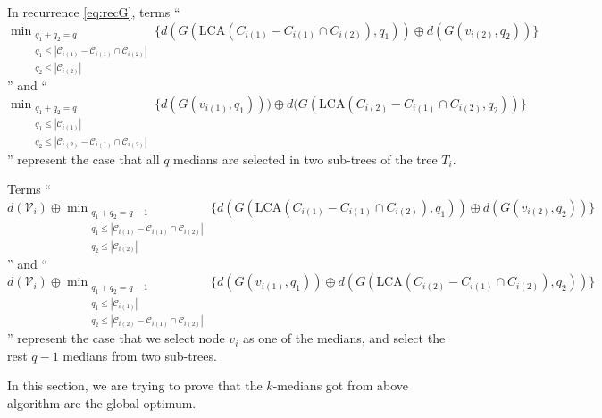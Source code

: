 \begin{itemize}
\begin{itemize}
        In recurrence \ref{eq:recG}, terms ``$ \min_{\substack{
                       q_1 + q_2 = q\\
                        q_1 \leq |\mathcal{C}_{i(1)} - \mathcal{C}_{i(1)} \cap \mathcal{C}_{i(2)}|\\
                        q_2 \leq |\mathcal{C}_{i(2)}| }}
                  \{ d(G(\mbox{LCA}(C_{i(1)} - C_{i(1)} \cap C_{i(2)}), q_1)) \oplus 
                     d(G(v_{i(2)}, q_2))
                  \}$''
                  and 
                  ``$ \min_{\substack{
                       q_1 + q_2 = q\\
                        q_1 \leq |\mathcal{C}_{i(1)}|\\
                        q_2 \leq |\mathcal{C}_{i(2)} - \mathcal{C}_{i(1)} \cap \mathcal{C}_{i(2)}| }}
                  \{ d(G(v_{i(1)}, q_1))) \oplus 
                     d(G(\mbox{LCA}(C_{i(2)} - C_{i(1)} \cap C_{i(2)}, q_2))
                  \}$''
        represent the case that all $q$ medians are selected in two sub-trees
        of the tree $T_i$. 

        Terms ``$d(\mathcal{V}_i) \oplus
            \min_{\substack{
                       q_1 + q_2 = q-1\\
                        q_1 \leq |\mathcal{C}_{i(1)} - \mathcal{C}_{i(1)} \cap \mathcal{C}_{i(2)}|\\
                        q_2 \leq |\mathcal{C}_{i(2)}| }}
                  \{ d(G(\mbox{LCA}(C_{i(1)} - C_{i(1)} \cap C_{i(2)}), q_1)) \oplus
                     d(G(v_{i(2)}, q_2))
                  \}$''
                  and 
            ``$d(\mathcal{V}_i) \oplus
            \min_{\substack{
                       q_1 + q_2 = q-1\\
                        q_1 \leq |\mathcal{C}_{i(1)}|\\
                        q_2 \leq |\mathcal{C}_{i(2)} - \mathcal{C}_{i(1)} \cap \mathcal{C}_{i(2)}|}}
                  \{ d(G(v_{i(1)}, q_1)) \oplus
                     d(G(\mbox{LCA}(C_{i(2)} - C_{i(1)} \cap C_{i(2)}), q_2))
                  \} $''
        represent the case that we select node $v_i$ as one of the 
        medians, and select the rest $q-1$ medians from two sub-trees.

    \end{itemize}
\end{itemize}

In this section, we are trying to prove that the $k$-medians got from
above algorithm are the global optimum.

